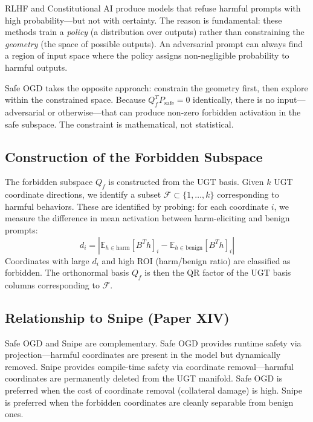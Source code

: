 \documentclass[11pt,a4paper]{article}
\theoremstyle{plain}\newtheorem{theorem}{Theorem}[section]
\begin{document}
RLHF and Constitutional AI produce models that refuse harmful prompts with high probability---but not with certainty. The reason is fundamental: these methods train a \textit{policy} (a distribution over outputs) rather than constraining the \textit{geometry} (the space of possible outputs). An adversarial prompt can always find a region of input space where the policy assigns non-negligible probability to harmful outputs.

Safe OGD takes the opposite approach: constrain the geometry first, then explore within the constrained space. Because $Q_f^T P_{\mathrm{safe}} = 0$ identically, there is no input---adversarial or otherwise---that can produce non-zero forbidden activation in the safe subspace. The constraint is mathematical, not statistical.

\subsection{Construction of the Forbidden Subspace}

The forbidden subspace $Q_f$ is constructed from the UGT basis. Given $k$ UGT coordinate directions, we identify a subset $\mathcal{F} \subset \{1, \ldots, k\}$ corresponding to harmful behaviors. These are identified by probing: for each coordinate $i$, we measure the difference in mean activation between harm-eliciting and benign prompts:
\begin{equation}
d_i = |\mathbb{E}_{h \in \mathrm{harm}}[B^T h]_i - \mathbb{E}_{h \in \mathrm{benign}}[B^T h]_i|
\end{equation}
Coordinates with large $d_i$ and high ROI (harm/benign ratio) are classified as forbidden. The orthonormal basis $Q_f$ is then the QR factor of the UGT basis columns corresponding to $\mathcal{F}$.

\subsection{Relationship to Snipe (Paper XIV)}

Safe OGD and Snipe are complementary. Safe OGD provides runtime safety via projection---harmful coordinates are present in the model but dynamically removed. Snipe provides compile-time safety via coordinate removal---harmful coordinates are permanently deleted from the UGT manifold. Safe OGD is preferred when the cost of coordinate removal (collateral damage) is high. Snipe is preferred when the forbidden coordinates are cleanly separable from benign ones.
\end{document}
